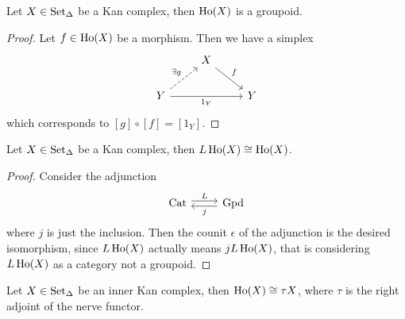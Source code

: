 \begin{prop}
    Let $X \in \operatorname{Set}_{\Delta}$ be a Kan complex, then $\operatorname{Ho} (X)$ is a groupoid.
\end{prop}

\begin{proof}
    Let $f \in \operatorname{Ho}(X)$ be a morphism. 
    Then we have a simplex
    \[
    \begin{tikzcd}
        & 
        X
        \arrow[rd, "f"]
        &
        \\
        Y
        \arrow[rr, "1_Y"']
        \arrow[ru, dashed, "\exists g"]
        &&
        Y
    \end{tikzcd}
    \]
    which corresponds to $[g] \circ [f] = [1_Y]$.
\end{proof}

\begin{cor}
    Let $X \in \operatorname{Set}_{\Delta}$ be a Kan complex, then $L \operatorname{Ho}(X) \cong \operatorname{Ho}(X)$.
\end{cor}

\begin{proof}
     Consider the adjunction 
     \[
     \begin{tikzcd}
        \Cat
        \arrow[r, shift left, "L"]
        &
        \Gpd 
        \arrow[l, shift left, "j"]
    \end{tikzcd}
     \]
     where $j$ is just the inclusion. 
     Then the counit $\epsilon$ of the adjunction is the desired isomorphism, since $L\operatorname{Ho}(X)$ actually means $jL\operatorname{Ho}(X)$, that is considering $L \operatorname{Ho}(X)$ as a category not a groupoid.
\end{proof}

\begin{prop}
    Let $X \in \operatorname{Set}_{\Delta}$ be an inner Kan complex, then $\operatorname{Ho}(X) \cong \tau X$, where $\tau$ is the right adjoint of the nerve functor.
\end{prop}

